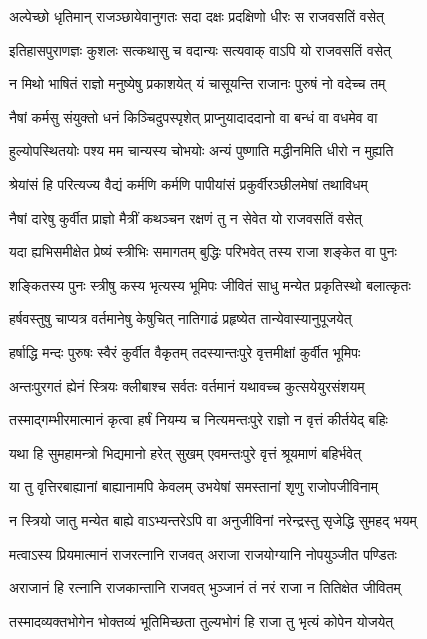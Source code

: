 \twolineshloka
{अल्पेच्छो धृतिमान् राजञ्छायेवानुगतः सदा}
{दक्षः प्रदक्षिणो धीरः स राजवसतिं वसेत्}


\twolineshloka
{इतिहासपुराणज्ञः कुशलः सत्कथासु च}
{वदान्यः सत्यवाक् वाऽपि यो राजवसतिं वसेत्}


\twolineshloka
{न मिथो भाषितं राज्ञो मनुष्येषु प्रकाशयेत्}
{यं चासूयन्ति राजानः पुरुषं नो वदेच्च तम्}


\twolineshloka
{नैषां कर्मसु संयुक्तो धनं किञ्चिदुपस्पृशेत्}
{प्राप्नुयादाददानो वा बन्धं वा वधमेव वा}


\twolineshloka
{हुल्योपस्थितयोः पश्य मम चान्यस्य चोभयोः}
{अन्यं पुष्णाति मद्धीनमिति धीरो न मुह्यति}


\twolineshloka
{श्रेयांसं हि परित्यज्य वैद्यं कर्मणि कर्मणि}
{पापीयांसं प्रकुर्वीरञ्छीलमेषां तथाविधम्}


\twolineshloka
{नैषां दारेषु कुर्वीत प्राज्ञो मैत्रीं कथञ्चन}
{रक्षणं तु न सेवेत यो राजवसतिं वसेत्}


\twolineshloka
{यदा ह्यभिसमीक्षेत प्रेष्यं स्त्रीभिः समागतम्}
{बुद्धिः परिभवेत् तस्य राजा शङ्केत वा पुनः}


\twolineshloka
{शङ्कितस्य पुनः स्त्रीषु कस्य भृत्यस्य भूमिपः}
{जीवितं साधु मन्येत प्रकृतिस्थो बलात्कृतः}


\twolineshloka
{हर्षवस्तुषु चाप्यत्र वर्तमानेषु केषुचित्}
{नातिगाढं प्रहृष्येत तान्येवास्यानुपूजयेत्}


\twolineshloka
{हर्षाद्धि मन्दः पुरुषः स्वैरं कुर्वीत वैकृतम्}
{तदस्यान्तःपुरे वृत्तमीक्षां कुर्वीत भूमिपः}


\twolineshloka
{अन्तःपुरगतं ह्येनं स्त्रियः क्लीबाश्च सर्वतः}
{वर्तमानं यथावच्च कुत्सयेयुरसंशयम्}


\twolineshloka
{तस्माद्गम्भीरमात्मानं कृत्वा हर्षं नियम्य च}
{नित्यमन्तःपुरे राज्ञो न वृत्तं कीर्तयेद् बहिः}


\twolineshloka
{यथा हि सुमहामन्त्रो भिद्यमानो हरेत् सुखम्}
{एवमन्तःपुरे वृत्तं श्रूयमाणं बहिर्भवेत्}


\twolineshloka
{या तु वृत्तिरबाह्यानां बाह्यानामपि केवलम्}
{उभयेषां समस्तानां शृणु राजोपजीविनाम्}


\twolineshloka
{न स्त्रियो जातु मन्येत बाह्ये वाऽभ्यन्तरेऽपि वा}
{अनुजीविनां नरेन्द्रस्तु सृजेद्धि सुमहद् भयम्}


\twolineshloka
{मत्वाऽस्य प्रियमात्मानं राजरत्नानि राजवत्}
{अराजा राजयोग्यानि नोपयुञ्जीत पण्डितः}


\twolineshloka
{अराजानं हि रत्नानि राजकान्तानि राजवत्}
{भुञ्जानं तं नरं राजा न तितिक्षेत जीवितम्}


\twolineshloka
{तस्मादव्यक्तभोगेन भोक्तव्यं भूतिमिच्छता}
{तुल्यभोगं हि राजा तु भृत्यं कोपेन योजयेत्}


